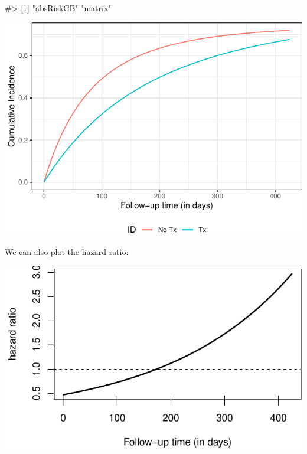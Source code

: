 \documentclass[
]{jss}
\begin{document}
\begin{CodeChunk}

\begin{CodeOutput}
#> [1] "absRiskCB" "matrix"
\end{CodeOutput}


\begin{center}\includegraphics[width=\textwidth,keepaspectratio=true]{../figures/stanford-risk-1} \end{center}

\end{CodeChunk}

We can also plot the hazard ratio:

\begin{CodeChunk}


\begin{center}\includegraphics[width=\textwidth,keepaspectratio=true]{../figures/unnamed-chunk-11-1} \end{center}

\end{CodeChunk}
\end{document}
